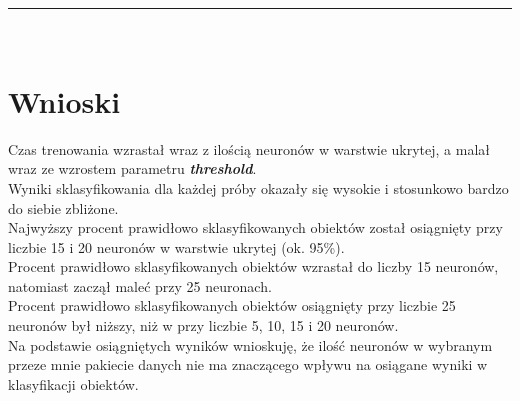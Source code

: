 \documentclass[a4paper,12pt]{article}
\newcommand{\linia}{\rule{\linewidth}{0.5pt}}
\theoremstyle{mytheor}
\begin{document}
\linia\\

\section*{Wnioski}
Czas trenowania wzrastał wraz z ilością neuronów w warstwie ukrytej, a malał wraz ze wzrostem parametru \textbf{\emph{threshold}}.\\

Wyniki sklasyfikowania dla każdej próby okazały się wysokie i stosunkowo bardzo do siebie zbliżone.\\

Najwyższy procent prawidłowo sklasyfikowanych obiektów został osiągnięty przy liczbie 15 i 20 neuronów w warstwie ukrytej (ok. 95\%).\\

Procent prawidłowo sklasyfikowanych obiektów wzrastał do liczby 15 neuronów, natomiast zaczął maleć przy 25 neuronach.\\

Procent prawidłowo sklasyfikowanych obiektów osiągnięty przy liczbie 25 neuronów był niższy, niż w przy liczbie 5, 10, 15 i 20 neuronów.\\

Na podstawie osiągniętych wyników wnioskuję, że ilość neuronów w wybranym przeze mnie pakiecie danych nie ma znaczącego wpływu na osiągane wyniki w klasyfikacji obiektów.
\end{document}
